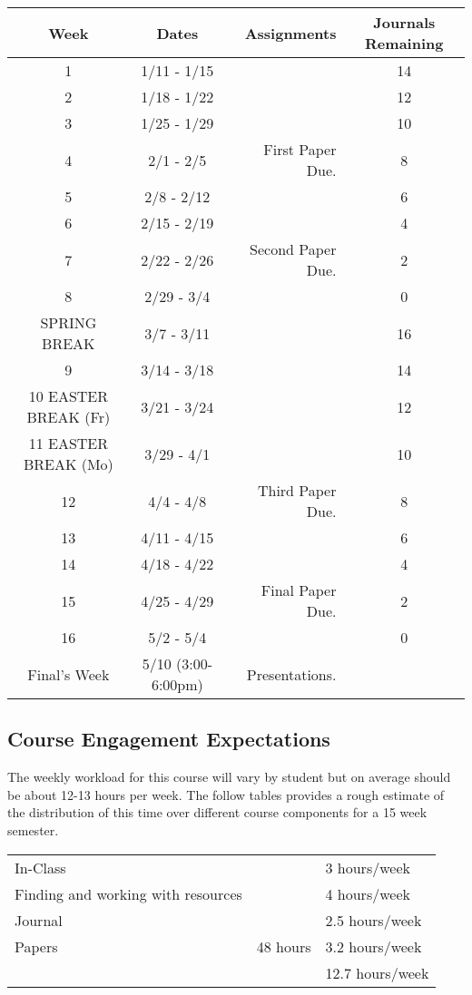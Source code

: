 \documentclass[]{tufte-handout}
\begin{document}
\begin{center}
\begin{tabular}{|c|c|r|c|}
\hline 
Week & Dates & Assignments & Journals Remaining\\
\hline
1 & 1/11 - 1/15 & & 14 \\
\hline
2 & 1/18 - 1/22 & & 12 \\
\hline
3 & 1/25 - 1/29 & & 10 \\
\hline
4 & 2/1 - 2/5 & First Paper Due. & 8\\
\hline
5 & 2/8 - 2/12 &  & 6\\
\hline
6 & 2/15 - 2/19 &  & 4\\
\hline
7 & 2/22 - 2/26 &  Second Paper Due. & 2 \\
\hline
8 & 2/29 - 3/4 &  & 0 \\
\hline 
SPRING BREAK & 3/7 - 3/11 &  & 16 \\
\hline
9 & 3/14 - 3/18 &  & 14\\
\hline
10 EASTER BREAK (Fr)& 3/21 - 3/24 & & 12 \\
\hline
11 EASTER BREAK (Mo)& 3/29 - 4/1 & & 10 \\
\hline
12 & 4/4 - 4/8 &  Third Paper Due. & 8 \\
\hline
13 & 4/11 - 4/15 &  & 6 \\
\hline
14 & 4/18 - 4/22 &  & 4 \\
\hline
15 & 4/25 - 4/29 & Final Paper Due. & 2\\ 
\hline
16 & 5/2 - 5/4 & & 0 \\
\hline
Final's Week & 5/10 (3:00-6:00pm) & Presentations.  &\\ 
\hline
\end{tabular}
\end{center}

\subsection{Course Engagement Expectations}

The weekly workload for this course will vary by student but on average should be about 12-13 hours per week.  The follow tables provides a rough estimate of the distribution of this time over different course components for a 15 week semester. 
\begin{center}
\begin{tabular}{|l|l|l|}
\hline
In-Class &      & 3 hours/week \\ 
Finding and working with resources &        & 4 hours/week \\
Journal &   & 2.5 hours/week \\ 
Papers & 48 hours & 3.2 hours/week \\
\hline 
& & 12.7 hours/week \\ 
\hline
\end{tabular}
\end{center}

    
\end{document}
